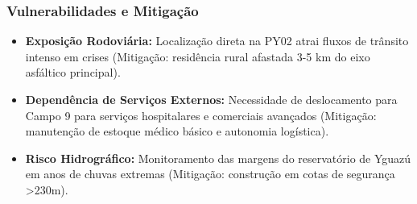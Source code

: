 \subsubsection{Vulnerabilidades e
Mitigação}

\begin{itemize}
\tightlist
\item
  \textbf{Exposição Rodoviária:} Localização direta na PY02 atrai fluxos
  de trânsito intenso em crises (Mitigação: residência rural afastada
  3-5 km do eixo asfáltico principal).
\item
  \textbf{Dependência de Serviços Externos:} Necessidade de deslocamento
  para Campo 9 para serviços hospitalares e comerciais avançados
  (Mitigação: manutenção de estoque médico básico e autonomia
  logística).
\item
  \textbf{Risco Hidrográfico:} Monitoramento das margens do reservatório
  de Yguazú em anos de chuvas extremas (Mitigação: construção em cotas
  de segurança \textgreater230m).
\end{itemize}

